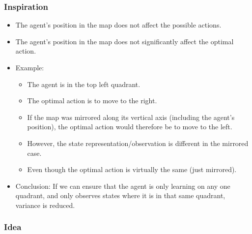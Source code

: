 \documentclass{article} %
\begin{document}
	\subsubsection{Inspiration}
	\begin{itemize}
		\item The agent's position in the map does not affect the possible actions.
		\item The agent's position in the map does not significantly affect the optimal action.
		\item Example:
		\begin{itemize}
			\item The agent is in the top left quadrant.
			\item The optimal action is to move to the right.
			\item If the map was mirrored along its vertical axis (including the agent's position), the optimal action would therefore be to move to the left.
			\item However, the state representation/observation is different in the mirrored case.
			\item Even though the optimal action is virtually the same (just mirrored).
		\end{itemize}
		\item Conclusion: If we can ensure that the agent is only learning on any one quadrant, and only observes states where it is in that same quadrant, variance is reduced.
	\end{itemize}
	
	\subsubsection{Idea}
	
\end{document}
